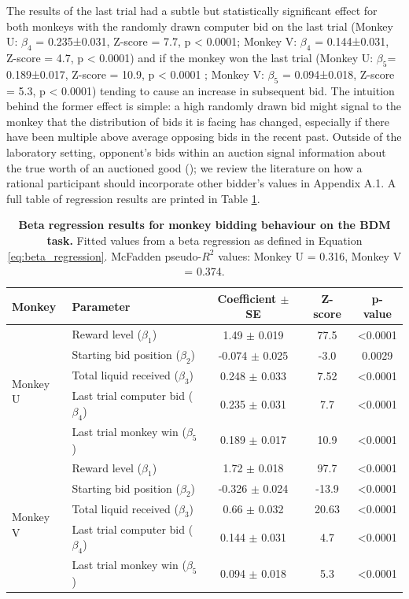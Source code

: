 The results of the last trial had a subtle but statistically significant effect for both monkeys with the randomly drawn computer bid on the last trial (Monkey U: $\beta_4$ = 0.235±0.031, Z-score = 7.7, p < 0.0001; Monkey V: $\beta_4$ = 0.144±0.031, Z-score = 4.7, p < 0.0001) and if the monkey won the last trial (Monkey U: $\beta_5$= 0.189±0.017, Z-score = 10.9, p < 0.0001 ; Monkey V: $\beta_5$ = 0.094±0.018, Z-score = 5.3, p < 0.0001) tending to cause an increase in subsequent bid. The intuition behind the former effect is simple: a high randomly drawn bid might signal to the monkey that the distribution of bids it is facing has changed, especially if there have been multiple above average opposing bids in the recent past. Outside of the laboratory setting, opponent’s bids within an auction signal information about the true worth of an auctioned good (\cite{milgromPuttingAuctionTheory2004}); we review the literature on how a rational participant should incorporate other bidder’s values in Appendix A.1. A full table of regression results are printed in Table \ref{tab:beta_regression}.

\begin{table}[htbp]
    \centering
    \begin{tabular}{llccc}
        \hline
        \textbf{Monkey} & \textbf{Parameter} & \textbf{Coefficient $\pm$ SE} & \textbf{Z-score} & \textbf{p-value} \\
        \hline
        \multirow{5}{*}{Monkey U} & Reward level ($\beta_1$) & 1.49 $\pm$ 0.019 & 77.5 & <0.0001 \\
        & Starting bid position ($\beta_2$) & -0.074 $\pm$ 0.025 & -3.0 & 0.0029 \\
        & Total liquid received ($\beta_3$) & 0.248 $\pm$ 0.033 & 7.52 & <0.0001 \\
        & Last trial computer bid ($\beta_4$) & 0.235 $\pm$ 0.031 & 7.7 & <0.0001 \\
        & Last trial monkey win ($\beta_5$) & 0.189 $\pm$ 0.017 & 10.9 & <0.0001 \\
        \hline
        \multirow{5}{*}{Monkey V} & Reward level ($\beta_1$) & 1.72 $\pm$ 0.018 & 97.7 & <0.0001 \\
        & Starting bid position ($\beta_2$) & -0.326 $\pm$ 0.024 & -13.9 & <0.0001 \\
        & Total liquid received ($\beta_3$) & 0.66 $\pm$ 0.032 & 20.63 & <0.0001 \\
        & Last trial computer bid ($\beta_4$) & 0.144 $\pm$ 0.031 & 4.7 & <0.0001 \\
        & Last trial monkey win ($\beta_5$) & 0.094 $\pm$ 0.018 & 5.3 & <0.0001 \\
        \hline
    \end{tabular}
\caption[Beta regression results for monkey bidding behaviour on the BDM task.]{\textbf{Beta regression results for monkey bidding behaviour on the BDM task.} Fitted values from a beta regression as defined in Equation \ref{eq:beta_regression}. McFadden pseudo-$R^2$ values: Monkey U = 0.316, Monkey V = 0.374.}
    \label{tab:beta_regression}
\end{table}

